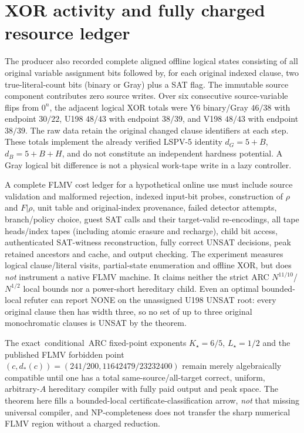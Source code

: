 \documentclass[11pt]{article}
\begin{document}
\section{XOR activity and fully charged resource ledger}
The producer also recorded complete aligned offline logical states consisting of all original variable assignment bits followed by, for each original indexed clause, two true-literal-count bits (binary or Gray) plus a SAT flag. The immutable source component contributes zero source writes. Over six consecutive source-variable flips from $0^n$, the adjacent logical XOR totals were Y6 binary/Gray $46/38$ with endpoint $30/22$, U198 $48/43$ with endpoint $38/39$, and V198 $48/43$ with endpoint $38/39$. The raw data retain the original changed clause identifiers at each step. These totals implement the already verified LSPV-5 identity $d_G=5+B$, $d_B=5+B+H$, and do not constitute an independent hardness potential. A Gray logical bit difference is not a physical work-tape write in a lazy controller.

A complete FLMV cost ledger for a hypothetical online use must include source validation and malformed rejection, indexed input-bit probes, construction of $\rho$ and $F|\rho$, unit table and original-index provenance, failed detector attempts, branch/policy choice, guest SAT calls and their target-valid re-encodings, all tape heads/index tapes (including atomic erasure and recharge), child bit access, authenticated SAT-witness reconstruction, fully correct UNSAT decisions, peak retained ancestors and cache, and output checking. The experiment measures logical clause/literal visits, partial-state enumeration and offline XOR, but does \emph{not} instrument a native FLMV machine. It claims neither the strict ARC $N^{11/10}$/$N^{1/2}$ local bounds nor a power-short hereditary child. Even an optimal bounded-local refuter can report NONE on the unassigned U198 UNSAT root: every original clause then has width three, so no set of up to three original monochromatic clauses is UNSAT by the theorem.

The exact \,conditional\, ARC fixed-point exponents $K_\star=6/5$, $L_\star=1/2$ and the published FLMV forbidden point $(c,d_*(c))=(241/200,11642479/23232400)$ remain merely algebraically compatible until one has a total same-source/all-target correct, uniform, arbitrary-$A$ hereditary compiler with fully paid output and peak space. The theorem here fills a bounded-local certificate-classification arrow, \emph{not} that missing universal compiler, and NP-completeness does not transfer the sharp numerical FLMV region without a charged reduction.
\end{document}
